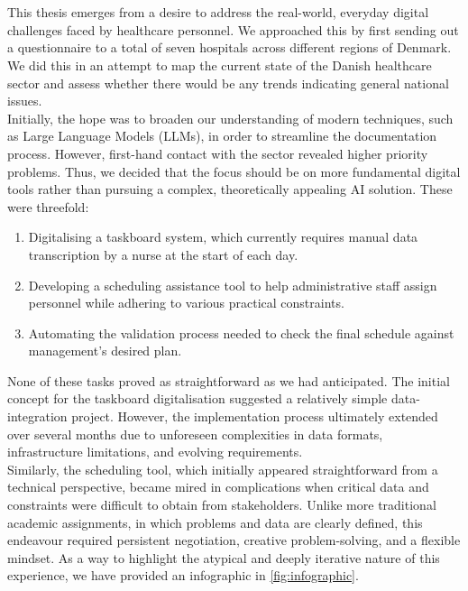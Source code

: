 \\
\\
This thesis emerges from a desire to address the real-world, everyday digital challenges faced by healthcare personnel. We approached this by first sending out a questionnaire to a total of seven hospitals across different regions of Denmark. We did this in an attempt to map the current state of the Danish healthcare sector and assess whether there would be any trends indicating general national issues.
\\
Initially, the hope was to broaden our understanding of modern techniques, such as Large Language Models (LLMs), in order to streamline the documentation process. However, first-hand contact with the sector revealed higher priority problems. Thus, we decided that the focus should be on more fundamental digital tools rather than pursuing a complex, theoretically appealing AI solution. These were threefold:
\begin{enumerate}
    \item Digitalising a taskboard system, which currently requires manual data transcription by a nurse at the start of each day.
    \item Developing a scheduling assistance tool to help administrative staff assign personnel while adhering to various practical constraints.
    \item Automating the validation process needed to check the final schedule against management's desired plan.
\end{enumerate}
None of these tasks proved as straightforward as we had anticipated. The initial concept for the taskboard digitalisation suggested a relatively simple data-integration project. However, the implementation process ultimately extended over several months due to unforeseen complexities in data formats, infrastructure limitations, and evolving requirements.
\\
Similarly, the scheduling tool, which initially appeared straightforward from a technical perspective, became mired in complications when critical data and constraints were difficult to obtain from stakeholders. Unlike more traditional academic assignments, in which problems and data are clearly defined, this endeavour required persistent negotiation, creative problem-solving, and a flexible mindset. As a way to highlight the atypical and deeply iterative nature of this experience, we have provided an infographic in \autoref{fig:infographic}.

